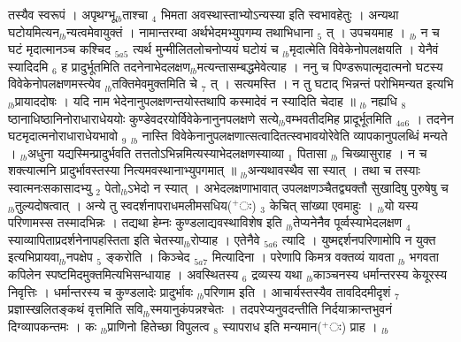 \documentclass[article,12pt,a4paper]{memoir}%
\newcommand{\add}[1]{($^{+}$#1)}
\newcounter{parCount}
\begin{document}
तस्यैव स्वरूपं । अपृथग्भू{\tiny $_{lb}$}ताश्चा {\tiny $_{4}$} भिमता अवस्थास्ताभ्योऽन्यस्या इति स्वभावहेतुः । अन्यथा घटोयमित्यन{\tiny $_{lb}$}न्यत्वमेवायुक्तं । नामान्तरम्वा अर्थभेदमभ्युपगम्य तथाभिधाना {\tiny $_{5}$} त् । उपचयमाह । {\tiny $_{lb}$} {\color{DodgerBlue3}न च घटं मृदात्मानञ्च कश्चिद {\tiny $_{5a5}$} त्यर्थ} मुन्मीलितलोचनोप्ययं घटोयं च {\tiny $_{lb}$}मृदात्मेति विवेकेनोपलक्षयति । येनैवं स्यादिदमि {\tiny $_{6}$} ह प्रादुर्भूतमिति तदनेनाभेदलक्षण{\tiny $_{lb}$}मत्यन्तासम्बद्धमेवेत्याह । ननु च पिण्डरूपात्मृदात्मनो घटस्य विवेकेनोपलक्षणमस्त्येव {\tiny $_{lb}$}तक्तिमेवमुक्तमिति चे {\tiny $_{7}$} त् । सत्यमस्ति । न तु घटाद् भिन्नन्तं परोभिमन्यत इत्यभि{\tiny $_{lb}$}प्रायाददोषः । यदि नाम भेदेनानुपलक्षणन्तयोस्तथापि कस्मादेवं न स्यादिति चेदाह ॥ {\tiny $_{lb}$} {\color{DodgerBlue3}नह्यधि {\tiny $_{8}$} ष्ठानाधिष्ठानिनोराधाराधेययोः कुण्डेवदरयोर्विवेकेनानुनपलक्षणे सत्ये{\tiny $_{lb}$}वम्भवतीदमिह प्रादूर्भूतमिति} {\tiny $_{4a6}$} । तदनेन घटमृदात्मनोराधाराधेयभावो {\tiny $_{9}$} {\tiny $_{lb}$} \leavevmode{} नास्ति विवेकेनानुपलक्षणात्सत्वादितत्स्वभावयोरेवेति व्यापकानुपलब्धिं मन्यते । {\tiny $_{lb}$}अधुना यद्यस्मिन्प्रादुर्भवति तत्ततोऽभिन्नमित्यस्याभेदलक्षणस्याव्या {\tiny $_{1}$} पितासा {\tiny $_{lb}$} चिख्यासुराह । न च शक्त्यात्मनि प्रादुर्भावस्तस्या नित्यमवस्थानाभ्युपगमात् ॥ {\tiny $_{lb}$}अन्यथावस्थैव सा स्यात् । तथा च तस्याः स्वात्मनःसकासादभ्यु {\tiny $_{2}$} पेतो{\tiny $_{lb}$}ऽभेदो न स्यात् । अभेदलक्षणाभावात् उपलक्षणञ्चैतद्व्यक्तौ सुखादिषु पुरुषेषु च {\tiny $_{lb}$}तुल्यदोषत्वात् । अन्ये तु स्वदर्शनापराधमलीमसधिय\add{ः} {\tiny $_{3}$} केचित् {\color{DodgerBlue3}सांख्या} एवमाहुः । {\tiny $_{lb}$}यो यस्य परिणामस्स तस्मादभिन्नः । तद्यथा हेम्नः कुण्डलाद्यवस्थाविशेष इति {\tiny $_{lb}$}तेप्यनेनैव पूर्व्वस्याभेदलक्षण {\tiny $_{4}$} स्याव्यापिताप्रदर्शनेनापहस्तिता इति चेतस्या{\tiny $_{lb}$}रोप्याह । {\color{DodgerBlue3}एतेनैवे} {\tiny $_{5a6}$} त्यादि । युष्मद्दर्शनपरिणामोपि न युक्त इत्यभिप्रायवा{\tiny $_{lb}$}नपक्षेप {\tiny $_{5}$} ङ्करोति । {\color{DodgerBlue3}किञ्चेद} {\tiny $_{5a7}$} मित्यादिना । परेणापि किमत्र वक्तव्यं यावता {\tiny $_{lb}$} \leavevmode{} भगवता {\color{DodgerBlue3}कपिलेन} स्पष्टमिदमुक्तमित्यभिसन्धायाह । अवस्थितस्य {\tiny $_{6}$} द्रव्यस्य यथा {\tiny $_{lb}$}काञ्चनस्य धर्मान्तरस्य केयूरस्य निवृत्तिः । धर्मान्तरस्य च कुण्डलादेः प्रादुर्भावः {\tiny $_{lb}$}परिणाम इति । {\color{DodgerBlue3}आचार्यस्तस्यैव} तावदिदमीदृशं {\tiny $_{7}$} प्रज्ञास्खलितङ्कथं वृत्तमिति सवि{\tiny $_{lb}$}स्मयानुकंपन्नश्चेतः । तदपरेप्यनुवदन्तीति निर्दयाक्रान्तभुवनं दिग्व्यापकन्तमः । कः {\tiny $_{lb}$}प्राणिनो हितेच्छा विपुलत्व {\tiny $_{8}$} स्यापराध इति मन्यमान\add{ः} प्राह ।
	{}
	\pend%
      {\tiny $_{lb}$}
\end{document}
